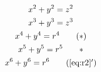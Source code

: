\documentclass{book}
\begin{document}
\setcounter{chapter}{2}

\begin{gather}
x^2+y^2 = z^2 \label{eq:r2} \\
x^3+y^3 = z^3 \notag \\
x^4+y^4 = r^4 \tag{$*$} \\
x^5+y^5 = r^5 \tag*{$*$} \\
x^6+y^6 = r^6 \tag{\ref{eq:r2}$'$}
\end{gather}
\end{document}
